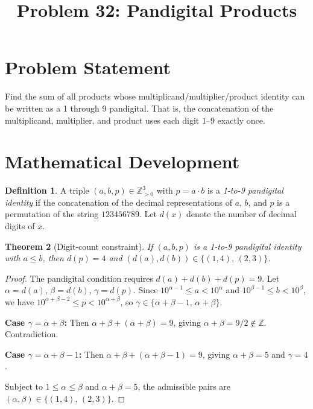 \documentclass[12pt]{article}
\title{Problem 32: Pandigital Products}
\author{}
\date{}
\newtheorem{theorem}{Theorem}
\theoremstyle{definition}
\newtheorem{definition}[theorem]{Definition}
\begin{document}
\maketitle

\section{Problem Statement}
Find the sum of all products whose multiplicand/multiplier/product identity can be written as a 1 through 9 pandigital. That is, the concatenation of the multiplicand, multiplier, and product uses each digit $1$--$9$ exactly once.

\section{Mathematical Development}

\begin{definition}
A triple $(a, b, p) \in \mathbb{Z}_{>0}^3$ with $p = a \cdot b$ is a \emph{1-to-9 pandigital identity} if the concatenation of the decimal representations of $a$, $b$, and $p$ is a permutation of the string $123456789$. Let $d(x)$ denote the number of decimal digits of $x$.
\end{definition}

\begin{theorem}[Digit-count constraint]
If $(a, b, p)$ is a 1-to-9 pandigital identity with $a \le b$, then $d(p) = 4$ and $(d(a), d(b)) \in \{(1, 4),\, (2, 3)\}$.
\end{theorem}

\begin{proof}
The pandigital condition requires $d(a) + d(b) + d(p) = 9$. Let $\alpha = d(a)$, $\beta = d(b)$, $\gamma = d(p)$. Since $10^{\alpha-1} \le a < 10^\alpha$ and $10^{\beta-1} \le b < 10^\beta$, we have $10^{\alpha+\beta-2} \le p < 10^{\alpha+\beta}$, so $\gamma \in \{\alpha+\beta-1,\, \alpha+\beta\}$.

\textbf{Case $\gamma = \alpha + \beta$:} Then $\alpha + \beta + (\alpha + \beta) = 9$, giving $\alpha + \beta = 9/2 \notin \mathbb{Z}$. Contradiction.

\textbf{Case $\gamma = \alpha + \beta - 1$:} Then $\alpha + \beta + (\alpha + \beta - 1) = 9$, giving $\alpha + \beta = 5$ and $\gamma = 4$.

Subject to $1 \le \alpha \le \beta$ and $\alpha + \beta = 5$, the admissible pairs are $(\alpha, \beta) \in \{(1,4),\, (2,3)\}$.
\end{proof}
\end{document}
